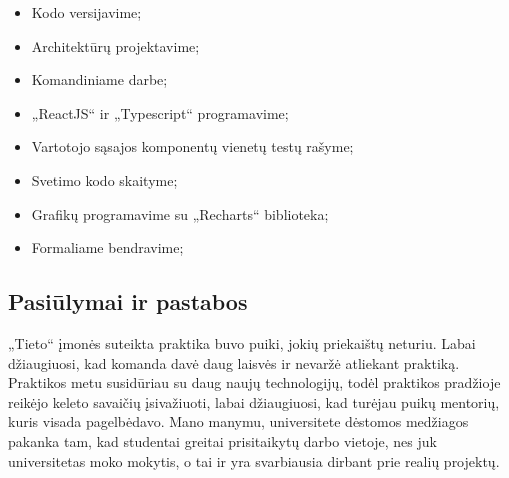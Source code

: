 \documentclass{VUMIFPSbakalaurinis}
\begin{document}
\begin{itemize}
    \item Kodo versijavime;
    \item Architektūrų projektavime;
    \item Komandiniame darbe;
    \item „ReactJS“ ir „Typescript“ programavime;
    \item Vartotojo sąsajos komponentų vienetų testų rašyme;
    \item Svetimo kodo skaityme;
    \item Grafikų programavime su „Recharts“ biblioteka;
    \item Formaliame bendravime;
\end{itemize}

\subsection{Pasiūlymai ir pastabos}
„Tieto“ įmonės suteikta praktika buvo puiki, jokių priekaištų neturiu. Labai džiaugiuosi, kad komanda davė daug laisvės ir nevaržė atliekant praktiką. Praktikos metu susidūriau su daug naujų technologijų, todėl praktikos pradžioje reikėjo keleto savaičių įsivažiuoti, labai džiaugiuosi, kad turėjau puikų mentorių, kuris visada pagelbėdavo. Mano manymu, universitete dėstomos medžiagos pakanka tam, kad studentai greitai prisitaikytų darbo vietoje, nes juk universitetas moko mokytis, o tai ir yra svarbiausia dirbant prie realių projektų.
 
\printbibliography[heading=bibintoc]  %
\end{document}
